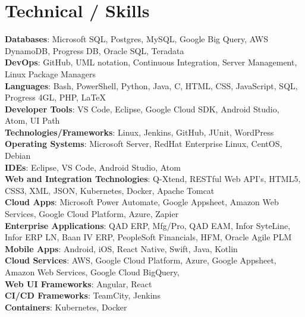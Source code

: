 \documentclass[letterpaper,11pt]{article}
\begin{document}
\section{Technical / Skills}
 \begin{itemize}[leftmargin=0.15in, label={}]
    \small{\item{
      \textbf{Databases}{: Microsoft SQL, Postgres, MySQL, Google Big Query, AWS DynamoDB, Progress DB, Oracle SQL, Teradata} \\
      \textbf{DevOps}{: GitHub, UML notation, Continuous Integration, Server Management, Linux Package Managers} \\
      \textbf{Languages}{: Bash, PowerShell, Python, Java, C, HTML, CSS, JavaScript, SQL, Progress 4GL, PHP, LaTeX} \\
      \textbf{Developer Tools}{: VS Code, Eclipse, Google Cloud SDK, Android Studio, Atom, UI Path} \\
      \textbf{Technologies/Frameworks}{: Linux, Jenkins, GitHub, JUnit, WordPress} \\
      \textbf{Operating Systems}{: Microsoft Server, RedHat Enterprise Linux, CentOS, Debian } \\
      \textbf{IDEs}{: Eclipse, VS Code, Android Studio, Atom} \\
      \textbf{Web and Integration Technologies}{: Q-Xtend, RESTful Web API's, HTML5, CSS3, XML, JSON, Kubernetes, Docker, Apache Tomcat} \\
      \textbf{Cloud Apps}{: Microsoft Power Automate, Google Appsheet, Amazon Web Services, Google Cloud Platform, Azure, Zapier} \\
      \textbf{Enterprise Applications}{: QAD ERP, Mfg/Pro, QAD EAM, Infor SyteLine, Infor ERP LN, Baan IV ERP, PeopleSoft Financials, HFM, Oracle Agile PLM} \\
      \textbf{Mobile Apps}{: Android, iOS, React Native, Swift, Java, Kotlin} \\
      \textbf{Cloud Services}{: AWS, Google Cloud Platform, Azure, Google Appsheet, Amazon Web Services, Google Cloud BigQuery,} \\
      \textbf{Web UI Frameworks}{: Angular, React} \\
      \textbf{CI/CD Frameworks}{: TeamCity, Jenkins} \\
      \textbf{Containers}{: Kubernetes, Docker} \\

    }}
  \end{itemize}
 \vspace{-16pt}
\end{document}
